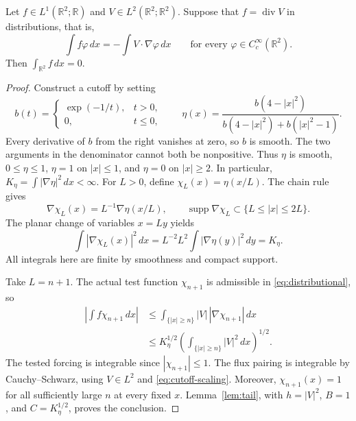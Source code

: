 \documentclass[10pt,twoside]{article}
\newcommand{\R}{\mathbb R}
\newcommand{\dd}{\,dx}
\newcommand{\Div}{\operatorname{div}}
\newcommand{\supp}{\operatorname{supp}}
\begin{document}
\begin{theorem}\label{thm:cancellation}
Let $f\in L^1(\R^2;\R)$ and $V\in L^2(\R^2;\R^2)$.
Suppose that $f=\Div V$ in distributions, that is,
\begin{equation}\label{eq:distributional}
 \int f\varphi\dd=-\int V\cdot\nabla\varphi\dd
       \qquad\text{for every }\varphi\in C_c^\infty(\R^2).
\end{equation}
Then $\int_{\R^2}f\dd=0$.
\end{theorem}
\begin{proof}
Construct a cutoff by setting
\[
 b(t)=
 \begin{cases}\exp(-1/t),&t>0,\\0,&t\le0,\end{cases}
 \qquad
 \eta(x)=\frac{b(4-|x|^2)}
                 {b(4-|x|^2)+b(|x|^2-1)}.
\]
Every derivative of $b$ from the right vanishes at zero, so $b$ is smooth.
The two arguments in the denominator cannot both be nonpositive.
Thus $\eta$ is smooth, $0\le\eta\le1$, $\eta=1$ on $|x|\le1$,
and $\eta=0$ on $|x|\ge2$. In particular,
$K_\eta=\int|\nabla\eta|^2\dd<\infty$.
For $L>0$, define $\chi_L(x)=\eta(x/L)$.
The chain rule gives
\begin{equation}\label{eq:cutoff-gradient}
 \nabla\chi_L(x)=L^{-1}\nabla\eta(x/L),\qquad
 \supp\nabla\chi_L\subset\{L\le|x|\le2L\}.
\end{equation}
The planar change of variables $x=Ly$ yields
\begin{equation}\label{eq:cutoff-scaling}
 \int|\nabla\chi_L(x)|^2\dd
 =L^{-2}L^2\int|\nabla\eta(y)|^2\,dy=K_\eta.
\end{equation}
All integrals here are finite by smoothness and compact support.

Take $L=n+1$. The actual test function $\chi_{n+1}$ is admissible in
\eqref{eq:distributional}, so
\begin{align}
 \left|\int f\chi_{n+1}\dd\right|
 &\le\int_{\{|x|\ge n\}}|V|\,|\nabla\chi_{n+1}|\dd\nonumber\\
 &\le K_\eta^{1/2}
       \left(\int_{\{|x|\ge n\}}|V|^2\dd\right)^{1/2}.
       \label{eq:derived-tail}
\end{align}
The tested forcing is integrable since $|\chi_{n+1}|\le1$.
The flux pairing is integrable by Cauchy--Schwarz, using
$V\in L^2$ and \eqref{eq:cutoff-scaling}.
Moreover, $\chi_{n+1}(x)=1$ for all sufficiently large $n$ at every
fixed $x$. Lemma~\ref{lem:tail}, with
$h=|V|^2$, $B=1$, and $C=K_\eta^{1/2}$, proves the conclusion.
\end{proof}
\end{document}
